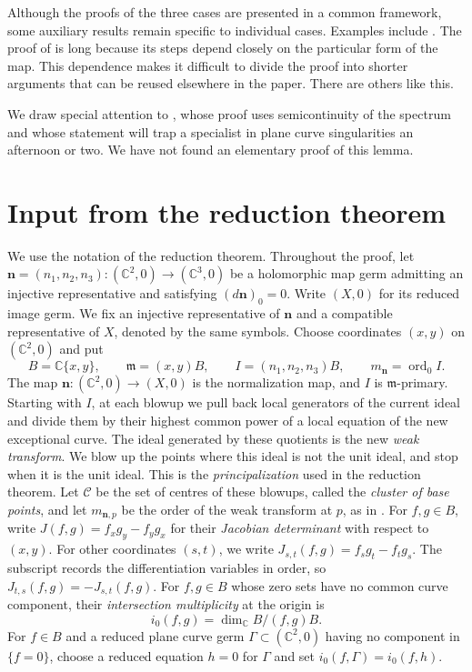 \documentclass[11pt,letterpaper]{article}
\numberwithin{equation}{section}
\theoremstyle{remark}
\theoremstyle{plain}
\newcommand{\C}{\mathbb{C}}
\newcommand{\ord}{\operatorname{ord}}
\begin{document}
Although the proofs of the three cases are presented in a common
framework, some auxiliary results remain specific to individual cases.
Examples include .
The proof of  is long because its steps
depend closely on the particular form of the map. This dependence makes
it difficult to divide the proof into shorter arguments that can be
reused elsewhere in the paper. There are others like this.

We draw special attention to , whose proof
uses semicontinuity of the spectrum and whose statement will trap a specialist 
in plane curve singularities an afternoon or two. We have not found an 
elementary
proof of this lemma.

\section{Input from the reduction theorem}
\label{sec:input}


We use the notation of the reduction theorem.  Throughout the proof, let
$\boldsymbol n=(n_1,n_2,n_3):(\C^2,0)\to(\C^3,0)$ be a holomorphic
map germ admitting an injective representative and satisfying
$(d\boldsymbol n)_0=0$.  Write $(X,0)$ for its reduced image germ.
We fix an injective representative of $\boldsymbol n$ and a compatible
representative of $X$, denoted by the same symbols.  Choose coordinates
$(x,y)$ on $(\C^2,0)$ and put
\[
 B=\C\{x,y\},\qquad \mathfrak m=(x,y)B,\qquad
 I=(n_1,n_2,n_3)B,\qquad m_{\boldsymbol n}=\ord_0 I.
\]
The map $\boldsymbol n:(\C^2,0)\to(X,0)$ is the normalization map, and
$I$ is $\mathfrak m$-primary.  Starting with $I$, at each blowup we
pull back local generators of the current ideal and divide them by
their highest common power of a local equation of the new exceptional
curve.  The ideal generated by these quotients is the new
\emph{weak transform}.  We blow up the points where this ideal is not
the unit ideal, and stop when it is the unit ideal.  This is the
\emph{principalization} used in the reduction theorem.
Let $\mathcal C$ be the set of
centres of these blowups, called the \emph{cluster of base points}, and
let $m_{\boldsymbol n,p}$ be the order of the weak transform at $p$,
as in \cite[Notation~2.4]{PortillaReduction}.
For $f,g\in B$, write $J(f,g)=f_xg_y-f_yg_x$ for their
\emph{Jacobian determinant}
with respect to $(x,y)$.  For other coordinates $(s,t)$, we write
$J_{s,t}(f,g)=f_sg_t-f_tg_s$.
The subscript records the differentiation variables in order, so
$J_{t,s}(f,g)=-J_{s,t}(f,g)$.
For $f,g\in B$ whose zero sets have no common curve component, their
\emph{intersection multiplicity} at the origin is
\[
 i_0(f,g)=\dim_\C B/(f,g)B.
\]
For $f\in B$ and a reduced plane curve germ $\Gamma\subset(\C^2,0)$
having no component in $\{f=0\}$, choose a reduced equation $h=0$ for $\Gamma$
and set $i_0(f,\Gamma)=i_0(f,h)$.
\end{document}
